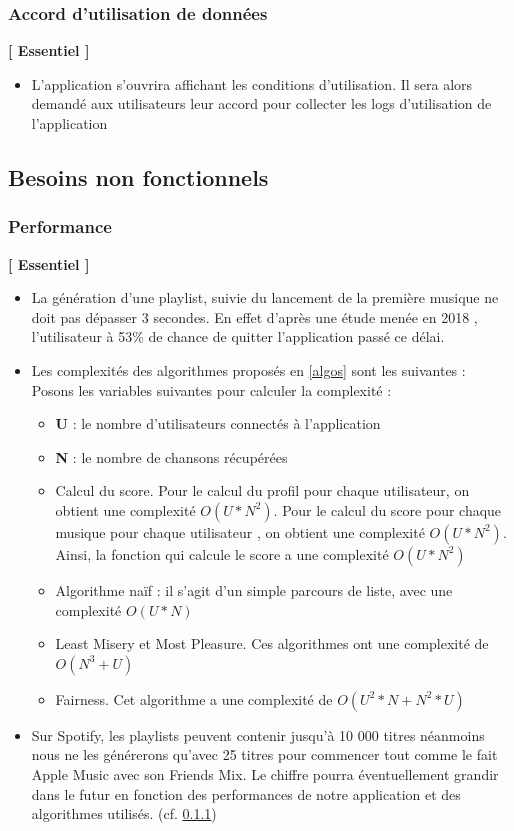 \documentclass{article}
\begin{document}
		\subsubsection{Accord d'utilisation de données}
		\textbf{[ Essentiel ]}
		\begin{itemize}
			\item L'application s'ouvrira affichant les conditions d'utilisation. Il sera alors demandé aux utilisateurs leur accord pour collecter les logs d'utilisation de l'application
		\end{itemize}
		\newpage
		\subsection{Besoins non fonctionnels}
		\subsubsection{Performance} \label{performance}
		\textbf{[ Essentiel ]}
		\begin{itemize}
			\item La génération d'une playlist, suivie du lancement de la première musique ne doit pas dépasser 3 secondes. En effet d'après une étude menée en 2018 \cite{MobileSpeedGoogle2018}, l'utilisateur à 53\% de chance de quitter l'application passé ce délai.
			      			
			\item Les complexités des algorithmes proposés en \ref{algos} sont les suivantes : \newline
			      Posons les variables suivantes pour calculer la complexité : 
			      \begin{itemize}
			      	\item[] \textbf{U} : le nombre d'utilisateurs connectés à l'application
			      	\item[] \textbf{N} : le nombre de chansons récupérées
			      \end{itemize}
			      \begin{itemize}
			      \item Calcul du score. Pour le calcul du profil pour chaque utilisateur, on obtient une complexité \textbf{$O(U*N^2)$}. Pour le calcul du score pour chaque musique pour chaque utilisateur , on obtient une complexité \textbf{$O(U*N^2)$}. Ainsi, la fonction qui calcule le score a une complexité \textbf{$O(U*N^2)$}
			      	\item Algorithme naïf : il s'agit d'un simple parcours de liste, avec une complexité \textbf{$O(U*N)$}
			      	\item Least Misery et Most Pleasure. Ces algorithmes ont une complexité de \textbf{$O(N^3 + U)$}
			      	\item Fairness. Cet algorithme a une complexité de \textbf{$O(U^2*N + N^2*U)$}
			      \end{itemize}
			\item Sur Spotify, les playlists peuvent contenir jusqu'à 10 000 titres néanmoins nous ne les générerons qu'avec 25 titres pour commencer tout comme le fait Apple Music avec son Friends Mix. Le chiffre pourra éventuellement grandir dans le futur en fonction des performances de notre application et des algorithmes utilisés. (cf. \ref{performance})
		\end{itemize}
\end{document}

